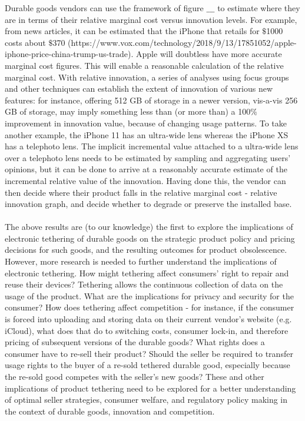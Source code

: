 \documentclass{article}
\begin{document}
Durable goods vendors can use the framework of figure $\_\_\_$ to estimate where they are in terms of their relative marginal cost versus innovation
levels. For example, from news articles, it can be estimated that the iPhone that retails for $\$$1000 costs about $\$$370 (https://www.vox.com/technology/2018/9/13/17851052/apple-iphone-price-china-trump-us-trade).
Apple will doubtless have more accurate marginal cost figures. This will enable a reasonable calculation of the relative marginal cost. With relative
innovation, a series of analyses using focus groups and other techniques can establish the extent of innovation of various new features: for instance,
offering 512 GB of storage in a newer version, vis-a-vis 256 GB of storage, may imply something less than (or more than) a 100$\%$ improvement in
innovation value, because of changing usage patterns. To take another example, the iPhone 11 has an ultra-wide lens whereas the iPhone XS has a telephoto
lens. The implicit incremental value attached to a ultra-wide lens over a telephoto lens needs to be estimated by sampling and aggregating users{'}
opinions, but it can be done to arrive at a reasonably accurate estimate of the incremental relative value of the innovation. Having done this, the
vendor can then decide where their product falls in the relative marginal cost - relative innovation graph, and decide whether to degrade or preserve
the installed base. \\
\\
The above results are (to our knowledge) the first to explore the implications of electronic tethering of durable goods on the strategic product
policy and pricing decisions for such goods, and the resulting outcomes for product obsolescence. However, more research is needed to further understand
the implications of electronic tethering. How might tethering affect consumers{'} right to repair and reuse { }their devices? Tethering allows the
continuous collection of data on the usage of the product. What are the implications for privacy and security for the consumer? How does tethering
affect competition - for instance, if the consumer is forced into uploading and storing data on their current vendor{'}s website (e.g. iCloud), what
does that do to switching costs, consumer lock-in, and therefore pricing of subsequent versions of the durable goods? What rights does a consumer
have to re-sell their product? Should the seller be required to transfer usage rights to the buyer of a re-sold tethered durable good, especially
because the re-sold good competes with the seller{'}s new goods? These and other implications of product tethering need to be explored for a better
understanding of optimal seller strategies, consumer welfare, and regulatory policy making in the context of durable goods, innovation and competition.
\end{document}
